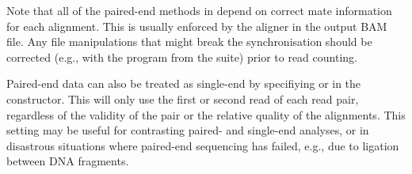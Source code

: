 \documentclass{report}\usepackage[]{graphicx}\usepackage[usenames,dvipsnames]{color}
\newcommand{\hlnum}[1]{\textcolor[rgb]{0.816,0.125,0.439}{#1}}%
\newcommand{\hlstr}[1]{\textcolor[rgb]{0.251,0.627,0.251}{#1}}%
\newcommand{\hlopt}[1]{\textcolor[rgb]{0,0,0}{#1}}%
\newcommand{\hlstd}[1]{\textcolor[rgb]{0.251,0.251,0.251}{#1}}%
\newcommand{\hlkwb}[1]{\textcolor[rgb]{0,0,0}{#1}}%
\newcommand{\hlkwc}[1]{\textcolor[rgb]{0.251,0.251,0.251}{#1}}%
\newcommand{\hlkwd}[1]{\textcolor[rgb]{0.878,0.439,0.125}{#1}}%
\newenvironment{knitrout}{}{} %
\begin{document}
\begin{knitrout}
\color{fgcolor}
\end{knitrout}

Note that all of the paired-end methods in  depend on correct mate information for each alignment.
This is usually enforced by the aligner in the output BAM file.
Any file manipulations that might break the synchronisation should be corrected 
(e.g., with the  program from the  suite) prior to read counting.

Paired-end data can also be treated as single-end by specifiying  or  in the  constructor. 
This will only use the first or second read of each read pair, regardless of the validity of the pair or the relative quality of the alignments.
This setting may be useful for contrasting paired- and single-end analyses, or in disastrous situations where paired-end sequencing has failed, e.g., due to ligation between DNA fragments.

\begin{knitrout}
\color{fgcolor}
\end{knitrout}
\end{document}
